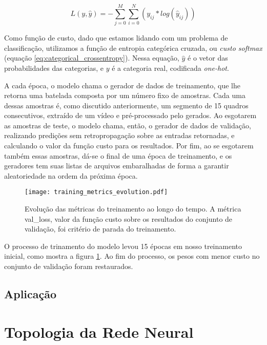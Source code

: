 \begin{equation} \label{eq:categorical_crossentropy}
    L(y,\hat{y})=-\sum\limits_{j=0}^M\sum\limits_{i=0}^N(y_{ij}*log(\hat{y}_{ij}))
\end{equation}

Como função de custo, dado que estamos lidando com um problema de classificação, utilizamos a função de entropia categórica cruzada, ou \textit{custo softmax} (equação \ref{eq:categorical_crossentropy}). Nessa equação, $\hat{y}$ é o vetor das probabilidades das categorias, e $y$ é a categoria real, codificada \textit{one-hot}.

A cada época, o modelo chama o gerador de dados de treinamento, que lhe retorna uma batelada composta por um número fixo de amostras. Cada uma dessas amostras é, como discutido anteriormente, um segmento de 15 quadros consecutivos, extraído de um vídeo e pré-processado pelo gerados. Ao esgotarem as amostras de teste, o modelo chama, então, o gerador de dados de validação, realizando predições sem retropropagação sobre as entradas retornadas, e calculando o valor da função custo para os resultados. Por fim, ao se esgotarem também essas amostras, dá-se o final de uma época de treinamento, e os geradores tem suas listas de arquivos embaralhadas de forma a garantir aleatoriedade na ordem da próxima época.

\begin{figure}[ht]
    \centering
    \texttt{[image: training\_metrics\_evolution.pdf]}
    \caption{Evolução das métricas do treinamento ao longo do tempo. A métrica val\_loss, valor da função custo sobre os resultados do conjunto de validação, foi critério de parada do treinamento.}
    \label{fig:train_metrics_evo}
\end{figure}

O processo de trinamento do modelo levou 15 épocas em nosso treinamento inicial, como mostra a figura \ref{fig:train_metrics_evo}. Ao fim do processo, os pesos com menor custo no conjunto de validação foram restaurados.

\subsection{Aplicação}
\label{subsec:application}

% 


\section{Topologia da Rede Neural}
\label{sec:topology}

